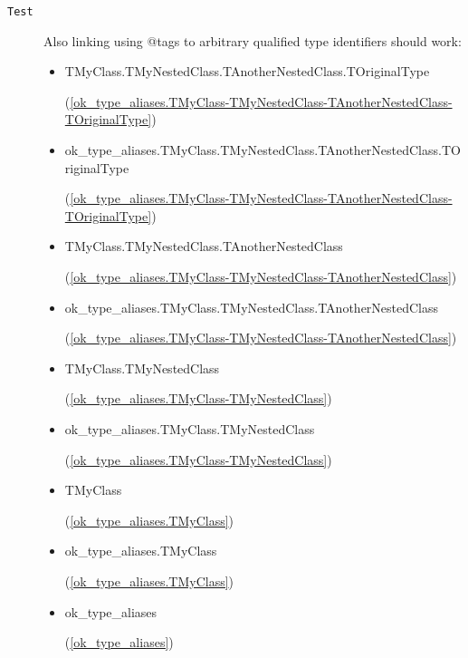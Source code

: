 \documentclass{report}
\begin{document}
\begin{description}
\item[\texttt{Test}]Also linking using @tags to arbitrary qualified type identifiers should work:

\begin{itemize}
\item \begin{ttfamily}TMyClass.TMyNestedClass.TAnotherNestedClass.TOriginalType\end{ttfamily}(\ref{ok_type_aliases.TMyClass-TMyNestedClass-TAnotherNestedClass-TOriginalType})
\item \begin{ttfamily}ok{\_}type{\_}aliases.TMyClass.TMyNestedClass.TAnotherNestedClass.TOriginalType\end{ttfamily}(\ref{ok_type_aliases.TMyClass-TMyNestedClass-TAnotherNestedClass-TOriginalType})
\item \begin{ttfamily}TMyClass.TMyNestedClass.TAnotherNestedClass\end{ttfamily}(\ref{ok_type_aliases.TMyClass-TMyNestedClass-TAnotherNestedClass})
\item \begin{ttfamily}ok{\_}type{\_}aliases.TMyClass.TMyNestedClass.TAnotherNestedClass\end{ttfamily}(\ref{ok_type_aliases.TMyClass-TMyNestedClass-TAnotherNestedClass})
\item \begin{ttfamily}TMyClass.TMyNestedClass\end{ttfamily}(\ref{ok_type_aliases.TMyClass-TMyNestedClass})
\item \begin{ttfamily}ok{\_}type{\_}aliases.TMyClass.TMyNestedClass\end{ttfamily}(\ref{ok_type_aliases.TMyClass-TMyNestedClass})
\item \begin{ttfamily}TMyClass\end{ttfamily}(\ref{ok_type_aliases.TMyClass})
\item \begin{ttfamily}ok{\_}type{\_}aliases.TMyClass\end{ttfamily}(\ref{ok_type_aliases.TMyClass})
\item \begin{ttfamily}ok{\_}type{\_}aliases\end{ttfamily}(\ref{ok_type_aliases})
\end{itemize}
\end{description}
\end{document}
